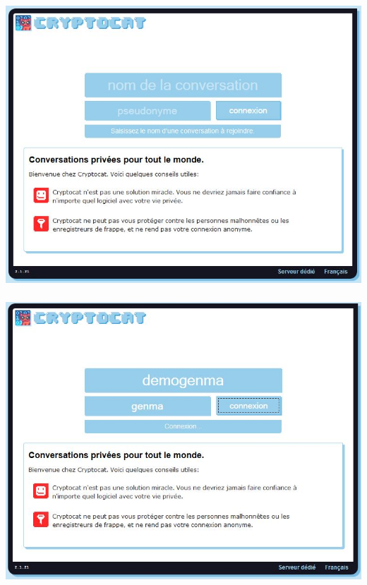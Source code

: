 \documentclass{beamer}
\begin{document}
\begin{frame}
\frametitle{}
\begin{center}
\includegraphics[scale=0.5] {./images/Cryptocat03.jpg} 
\end{center}
\end{frame}

\begin{frame}
\frametitle{}
\begin{center}
\includegraphics[scale=0.5] {./images/Cryptocat04.jpg} 
\end{center}
\end{frame}
\end{document}
